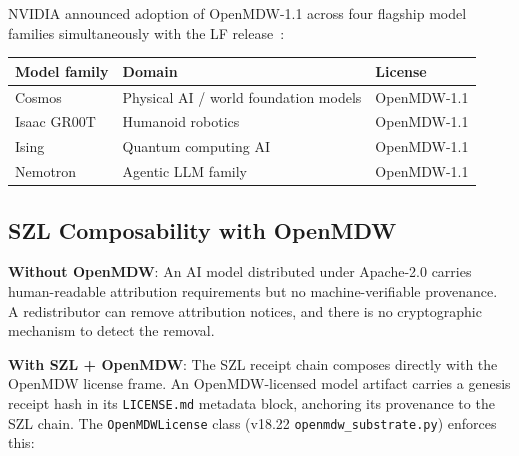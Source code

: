 NVIDIA announced adoption of OpenMDW-1.1 across four flagship model families
simultaneously with the LF release~\cite{openmdw_deep}:

\begin{center}
\begin{tabular}{lll}
\textbf{Model family} & \textbf{Domain} & \textbf{License} \\
\hline
Cosmos & Physical AI / world foundation models & OpenMDW-1.1 \\
Isaac GR00T & Humanoid robotics & OpenMDW-1.1 \\
Ising & Quantum computing AI & OpenMDW-1.1 \\
Nemotron & Agentic LLM family & OpenMDW-1.1 \\
\end{tabular}
\end{center}

\subsection{SZL Composability with OpenMDW}
\label{ssec:openmdw-szl}

\textbf{Without OpenMDW}: An AI model distributed under Apache-2.0 carries
human-readable attribution requirements but no machine-verifiable provenance.
A redistributor can remove attribution notices, and there is no cryptographic
mechanism to detect the removal.

\textbf{With SZL + OpenMDW}: The SZL receipt chain composes directly with
the OpenMDW license frame.  An OpenMDW-licensed model artifact carries a
genesis receipt hash in its \texttt{LICENSE.md} metadata block, anchoring
its provenance to the SZL chain.  The \texttt{OpenMDWLicense} class
(v18.22 \texttt{openmdw\_substrate.py}) enforces this:

